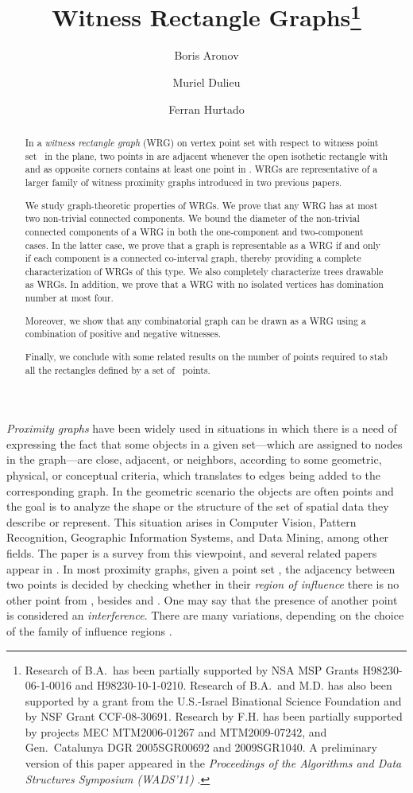 \documentclass{llncs}
\title{Witness Rectangle Graphs\thanks{Research of B.A.\ has been partially supported by NSA MSP
    Grants H98230-06-1-0016 and H98230-10-1-0210.  Research of B.A.\
    and M.D. has also been supported by a grant from the U.S.-Israel
    Binational Science Foundation and by NSF Grant CCF-08-30691.
    Research by F.H. has been partially supported by projects MEC
    MTM2006-01267 and MTM2009-07242, and Gen.~Catalunya DGR
    2005SGR00692 and 2009SGR1040.
A preliminary version of this paper appeared in the \emph{Proceedings of
  the Algorithms and Data Structures Symposium (WADS'11)} \cite{ADH11}.}}
\author{Boris Aronov\inst{1}\and
  Muriel Dulieu\inst{1}
  \and
  Ferran Hurtado\inst{2}
}
\institute{Department of Computer Science and Engineering, Polytechnic 
 Institute of NYU, Brooklyn, NY~11201-3840, USA;
 \email{aronov@poly.edu}, \email{mdulieu@gmail.com}
 \and Departament de Matem\`{a}tica Aplicada~II,
    Universitat Polit\`{e}cnica de Catalunya (UPC),
    Barcelona, Spain. \email{ferran.hurtado@upc.edu}}
\makeatletter
\renewcommand\section{\@startsection{section}{1}{\z@}{-8\p@ \@plus -2\p@ \@minus -2\p@}{6\p@ \@plus 2\p@ \@minus 2\p@}{\normalfont\large\bfseries\boldmath
                        \rightskip=\z@ \@plus 4em\pretolerance=10000 }}
\makeatother
\begin{document}
\maketitle

\begin{abstract}
    In a \emph{witness rectangle graph} (WRG) on vertex point set 
    with respect to witness point set~ in the plane, two points
     in  are adjacent whenever the open isothetic rectangle with  and
     as opposite corners contains at least one point in
    .  WRGs are representative of a larger family of witness
    proximity graphs introduced in two previous papers.



    We study graph-theoretic properties of WRGs.  We prove that
    any WRG has at most two non-trivial connected components.  We
    bound the diameter of the non-trivial connected components of a
    WRG in both the one-component and two-component cases.  In the
    latter case, we prove that a graph is representable as a
    WRG if and only if each component is a connected co-interval graph, thereby
    providing a complete characterization of WRGs of this type.  We
    also completely characterize trees drawable as WRGs. 
    In addition, we prove that a WRG with no isolated vertices has domination number at most four.
    
    Moreover, we show that any combinatorial graph can be drawn as a WRG using a combination of 
    positive and negative witnesses.

    Finally, we conclude with some related results on the number of
    points required to stab all the rectangles defined by a set of
    ~points.
  \end{abstract}


\pagestyle{plain}

\section{Introduction}\label{section:introduction}

\emph{Proximity graphs} have been widely used in situations in which there is a need of expressing the fact that some objects in a given set---which are
assigned to nodes in the graph---are close, adjacent, or neighbors, according to some geometric, physical, or conceptual
criteria, which translates to edges being added to the corresponding graph.
In the geometric scenario the objects are often points and the goal is to analyze the shape or the structure of the set of spatial data they describe or represent. This situation arises in Computer Vision, Pattern Recognition, Geographic Information Systems, and Data Mining, among other fields. The paper \cite{JT92} is a survey from this viewpoint, and several related papers appear in \cite{T88}. In most proximity graphs, given a point set , the adjacency between two points  is decided by checking
whether in their \emph{region of influence} there is no
other point from , besides  and . One may say that the presence of another point
is considered an \emph{interference}. There are many variations,
depending on the choice of the family of influence regions \cite{JT92,Co06,Li08}.
\end{document}
